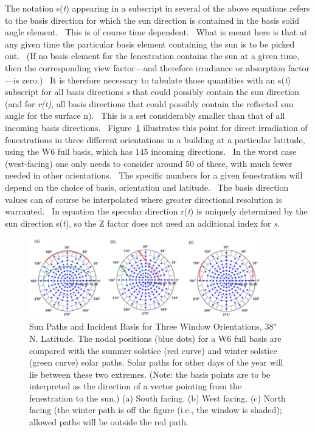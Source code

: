 The notation s(\emph{t}) appearing in a subscript in several of the above equations refers to the basis direction for which the sun direction is contained in the basis solid angle element.~ This is of course time dependent.~ What is meant here is that at any given time the particular basis element containing the sun is to be picked out.~ (If no basis element for the fenestration contains the sun at a given time, then the corresponding view factor---and therefore irradiance or absorption factor---is zero.)~ It is therefore necessary to tabulate those quantities with an s(\emph{t}) subscript for all basis directions \emph{s} that could possibly contain the sun direction (and for \emph{r(t)}, all basis directions that could possibly contain the reflected sun angle for the surface n).~ This is a set considerably smaller than that of all incoming basis directions.~ Figure~\ref{fig:sun-paths-and-incident-basis-for-three-window} illustrates this point for direct irradiation of fenestrations in three different orientations in a building at a particular latitude, using the W6 full basis, which has 145 incoming directions.~ In the worst case (west-facing) one only needs to consider around 50 of these, with much fewer needed in other orientations.~ The specific numbers for a given fenestration will depend on the choice of basis, orientation and latitude.~ The basis direction values can of course be interpolated where greater directional resolution is warranted.~ In equation the specular direction r(\emph{t}) is uniquely determined by the sun direction s(\emph{t}), so the Z factor does not need an additional index for \emph{s}.

\begin{figure}[hbtp] %
\centering
\includegraphics[width=0.9\textwidth, height=0.9\textheight, keepaspectratio=true]{media/image1410.png}
\caption{Sun Paths and Incident Basis for Three Window Orientations, 38\(^{o}\) N. Latitude. The nodal positions (blue dots) for a W6 full basis are compared with the summer solstice (red curve) and winter solstice (green curve) solar paths. Solar paths for other days of the year will lie between these two extremes. (Note: the basis points are to be interpreted as the direction of a vector pointing from the fenestration to the sun.) (a) South facing. (b) West facing. (c) North facing (the winter path is off the figure (i.e., the window is shaded); allowed paths will be outside the red path. \protect \label{fig:sun-paths-and-incident-basis-for-three-window}}
\end{figure}

